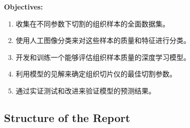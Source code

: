 \textbf{Objectives:}

\begin{enumerate}
\item 收集在不同参数下切割的组织样本的全面数据集。
\item 使用人工图像分类来对这些样本的质量和特征进行分类。
\item 开发和训练一个能够评估组织样本质量的深度学习模型。
\item 利用模型的见解来确定组织切片仪的最佳切割参数。
\item 通过实证测试和改进来验证模型的预测结果。
\end{enumerate}

\subsection{Structure of the Report}




